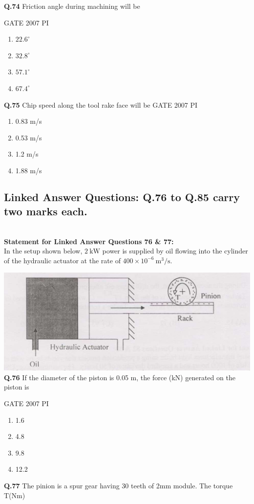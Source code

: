 \documentclass[journal,12pt,onecolumn]{exam}
\theoremstyle{remark}
\begin{document}
\noindent
\textbf{Q.74}
Friction angle during machining will be

\hfill{GATE 2007 PI}
\begin{enumerate}
    \item $22.6^{\circ}$
    \item $32.8^{\circ}$
    \item $57.1^{\circ}$
    \item $67.4^{\circ}$
    \end{enumerate}
    \noindent
    \textbf{Q.75}
    Chip speed along the tool rake face will be
\hfill{GATE 2007 PI}
\begin{enumerate}
    \item 0.83 m/s
    \item 0.53 m/s
    \item 1.2 m/s
    \item 1.88 m/s
    \end{enumerate}
    \subsection{Linked Answer Questions: Q.76 to Q.85 carry two marks each.}\\

    
\textbf{Statement for Linked Answer Questions  76 \& 77:}\\
In the setup shown below, $2 \ \mathrm{kW}$ power is supplied by oil flowing into the cylinder of the hydraulic actuator at the rate of $400 \times 10^{-6} \ \mathrm{m}^3/\mathrm{s}$.

    \includegraphics[width=0.8\linewidth]{figs/Q.76.png}\\
    \noindent
    \textbf{Q.76}
    If the diameter of the piston is 0.05 m, the force (kN) generated on the piston is
 
    \hfill{GATE 2007 PI}
    \begin{enumerate}
        \item 1.6
        \item 4.8
        \item 9.8
        \item 12.2
    \end{enumerate}
    \noindent
    \textbf{Q.77}
    The pinion is a spur gear having 30 teeth of 2mm module. The torque T(Nm)
    
\end{document}

